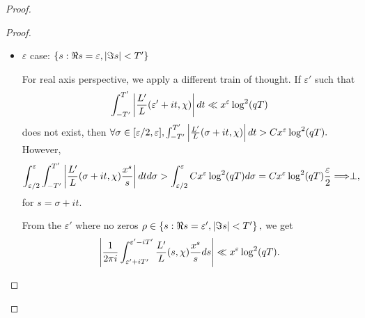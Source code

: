 \begin{proof}
\begin{proof}
\begin{itemize}
    If we have the worst case that all zeros are arranged vertically, then in interval $[T, T+1],$ the neighbors of zeros occupy $$\frac{1}{\log(qT)} \cdot \log(qT) \ll 1$$ length of the interval. Thus, it is sufficient to deduce that there is a $T' \in [T, T+1]$ such that $T' \notin \left[ \Im \rho - \frac{1}{c \log(qT)}, \Im \rho + \frac{1}{c \log(qT)} \right], \forall \rho.$

    For the $T',$ we obtain
    \begin{align*}
        \abs{\frac{1}{2 \pi i} \int_{1 + \frac{1}{\log x} \pm iT'}^{\varepsilon \pm iT'} \frac{L'}{L}(s, \chi) \frac{x^s}{s} ds} &\ll \int_{1 + \frac{1}{\log x} \pm iT'}^{\varepsilon \pm iT'} \abs{\frac{L'}{L}(s, \chi) \frac{x^s}{s}} ds \\
        &\ll \frac{x}{T'} \int_{1 + \frac{1}{\log x} \pm iT'}^{\varepsilon \pm iT'} \abs{\frac{L'}{L}(s, \chi)} ds \qquad (\text{by lemma 7.15}) \\
        &\ll \frac{x}{T'} \log (qT').
    \end{align*}

    \item $\varepsilon$ case: $\left\{ s: \Re s = \varepsilon, \left\lvert \Im s \right\rvert < T' \right\}$
    
    For real axis perspective, we apply a different train of thought. If $\varepsilon'$ such that $$\int_{-T'}^{T'} \left\lvert \frac{L'}{L}(\varepsilon' + it, \chi) \right\rvert dt \ll x^\varepsilon \log^2(qT)$$ does not exist, then $\forall \sigma \in [\varepsilon/2, \varepsilon], \int_{-T'}^{T'} \left\lvert \frac{L'}{L}(\sigma + it, \chi) \right\rvert dt > Cx^\varepsilon \log^2(qT).$ However, $$\int_{\varepsilon/2}^\varepsilon \int_{-T'}^{T'} \left\lvert \frac{L'}{L}(\sigma + it, \chi) \frac{x^s}{s} \right\rvert dt d\sigma > \int_{\varepsilon/2}^\varepsilon Cx^\varepsilon \log^2(qT) d\sigma = Cx^\varepsilon \log^2(qT) \frac{\varepsilon}{2} \Longrightarrow \perp,$$ for $s = \sigma + it.$

    From the $\varepsilon'$ where no zeros $\rho \in \left\{ s: \Re s = \varepsilon', \left\lvert \Im s \right\rvert < T' \right\},$ we get $$\left\lvert \frac{1}{2 \pi i} \int_{\varepsilon' + iT'}^{\varepsilon' - iT'} \frac{L'}{L}(s, \chi) \frac{x^s}{s} ds \right\rvert \ll x^\varepsilon \log^2 (qT).$$
\end{itemize}


\end{proof}
\end{proof}
